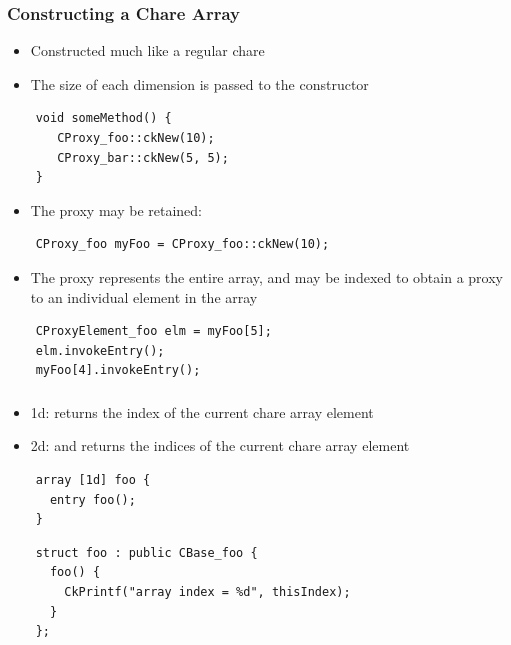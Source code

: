 \begin{frame}[fragile]
  \frametitle{Constructing a Chare Array}
  \begin{itemize}
    \item Constructed much like a regular chare
    \item The size of each dimension is passed to the constructor
  \end{itemize}
  \begin{lstlisting}
    void someMethod() {
       CProxy_foo::ckNew(10);
       CProxy_bar::ckNew(5, 5);
    }
  \end{lstlisting}
  \begin{itemize}
  \item The proxy may be retained:
  \end{itemize}
  \begin{lstlisting}
    CProxy_foo myFoo = CProxy_foo::ckNew(10);
  \end{lstlisting}
  \begin{itemize}
  \item The proxy represents the entire array, and may be indexed to obtain a
    proxy to an individual element in the array
  \end{itemize}
  \begin{lstlisting}
    CProxyElement_foo elm = myFoo[5];
    elm.invokeEntry();
    myFoo[4].invokeEntry();
  \end{lstlisting}
\end{frame}

\begin{frame}[fragile]
  \frametitle{}
  \begin{itemize}
  \item 1d:  returns the index of the current chare array element
  \item 2d:  and  returns the indices of
    the current chare array element
  \end{itemize}
  \begin{lstlisting}
    array [1d] foo {
      entry foo();
    }
  \end{lstlisting}

  \begin{lstlisting}
    struct foo : public CBase_foo {
      foo() {
        CkPrintf("array index = %d", thisIndex);
      }
    };
  \end{lstlisting}

\end{frame}

